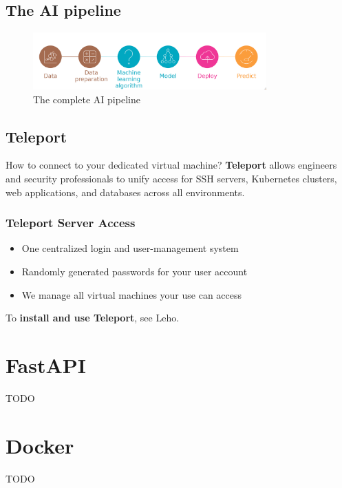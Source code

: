 \documentclass{article}
\begin{document}
\subsection{The AI pipeline}

\begin{figure}[H]
    \centering
    \includegraphics[width=0.8\textwidth]{complete-pipeline.png}
    \caption{The complete AI pipeline}
\end{figure}

\subsection{Teleport}

How to connect to your dedicated virtual machine? 
\textbf{Teleport} allows engineers and security professionals 
to unify access for SSH servers, Kubernetes clusters, 
web applications, and databases across all environments.

\subsubsection{Teleport Server Access}

\begin{itemize}
    \item One centralized login and user-management system
    \item Randomly generated passwords for your user account
    \item We manage all virtual machines your use can access
\end{itemize}

To \textbf{install and use Teleport}, see Leho.

\section{FastAPI}

TODO

\section{Docker}

TODO
\end{document}
